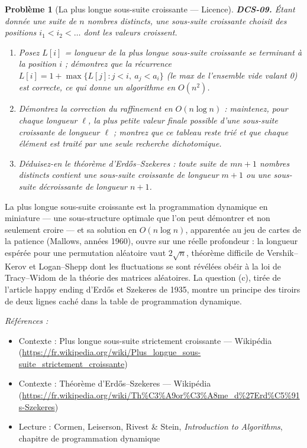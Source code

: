 \documentclass[11pt]{article}
\newtheorem{problem}{Problème}
\newenvironment{refs}{\par\small\noindent\emph{Références :}\begin{itemize}\setlength\itemsep{0pt}}{\end{itemize}\normalsize}
\begin{document}
\bigskip

\begin{problem}[{La plus longue sous-suite croissante --- Licence}]
\textbf{DCS-09.} Étant donnée une suite de $n$ nombres distincts, une sous-suite croissante choisit des positions $i_1 < i_2 < \dots$ dont les valeurs croissent.
\begin{enumerate}
\item[(a)] Posez $L[i]$ = longueur de la plus longue sous-suite croissante se terminant à la position $i$ ; démontrez que la récurrence $L[i] = 1 + \max\{L[j] : j < i,\ a_j < a_i\}$ (le max de l'ensemble vide valant 0) est correcte, ce qui donne un algorithme en $O(n^2)$.
\item[(b)] Démontrez la correction du raffinement en $O(n \log n)$ : maintenez, pour chaque longueur $\ell$, la plus petite valeur finale possible d'une sous-suite croissante de longueur $\ell$ ; montrez que ce tableau reste trié et que chaque élément est traité par une seule recherche dichotomique.
\item[(c)] Déduisez-en le théorème d'Erd\H{o}s--Szekeres : toute suite de $mn + 1$ nombres distincts contient une sous-suite croissante de longueur $m+1$ ou une sous-suite décroissante de longueur $n+1$.
\end{enumerate}

\end{problem}

\noindent La plus longue sous-suite croissante est la programmation dynamique en miniature --- une sous-structure optimale que l'on peut démontrer et non seulement croire --- et sa solution en $O(n \log n)$, apparentée au jeu de cartes de la patience (Mallows, années 1960), ouvre sur une réelle profondeur : la longueur espérée pour une permutation aléatoire vaut $2\sqrt{n}$, théorème difficile de Vershik--Kerov et Logan--Shepp dont les fluctuations se sont révélées obéir à la loi de Tracy--Widom de la théorie des matrices aléatoires. La question (c), tirée de l'article \og{} happy ending \fg{} d'Erd\H{o}s et Szekeres de 1935, montre un principe des tiroirs de deux lignes caché dans la table de programmation dynamique.

\begin{refs}
\item Contexte : Plus longue sous-suite strictement croissante --- Wikipédia (\url{https://fr.wikipedia.org/wiki/Plus_longue_sous-suite_strictement_croissante})
\item Contexte : Théorème d'Erd\H{o}s--Szekeres --- Wikipédia (\url{https://fr.wikipedia.org/wiki/Th%C3%A9or%C3%A8me_d%27Erd%C5%91s-Szekeres})
\item Lecture : Cormen, Leiserson, Rivest \& Stein, \textit{Introduction to Algorithms}, chapitre de programmation dynamique
\end{refs}
\end{document}
